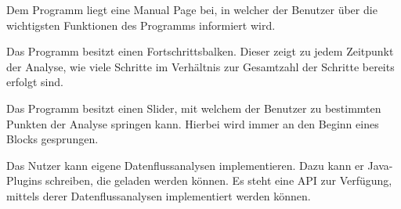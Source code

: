 Dem Programm liegt eine Manual Page bei, in welcher der Benutzer über die wichtigsten Funktionen des Programms informiert wird.

Das Programm besitzt einen Fortschrittsbalken. Dieser zeigt zu jedem Zeitpunkt der Analyse, wie viele Schritte im Verhältnis zur Gesamtzahl der Schritte bereits erfolgt sind.

Das Programm besitzt einen Slider, mit welchem der Benutzer zu bestimmten Punkten der Analyse springen kann. Hierbei wird immer an den Beginn eines Blocks gesprungen.

Das Nutzer kann eigene Datenflussanalysen implementieren. Dazu kann er Java-Plugins schreiben, die geladen werden können. Es steht eine API zur Verfügung, mittels derer Datenflussanalysen implementiert werden können.